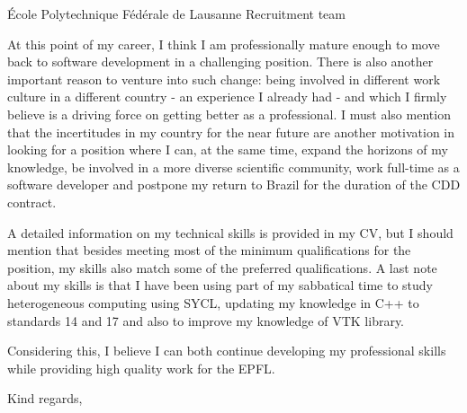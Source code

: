 \documentclass[11pt]{letter}
\begin{document}
\begin{letter}{École Polytechnique Fédérale de Lausanne Recruitment team}
  

  
  At this point of my career, I think I am professionally mature enough to move back to software development in a challenging position. There is also another important reason to venture into such change: being involved in different
  work culture in a different country - an experience I already had - and which I firmly believe is a driving force
  on getting better as a professional. I must also mention that the incertitudes in my country for the near future are another motivation in looking for a position where I can, at the same time, expand the horizons of my knowledge, be involved in a more diverse scientific community, work full-time as a software developer and postpone my return to Brazil for the duration of the CDD contract.

  A detailed information on my technical skills is provided in my CV, but I should mention that besides meeting most of the minimum qualifications for the position, my skills also match some of the preferred qualifications. A last note about my skills is that I have been using part of my sabbatical time to study heterogeneous computing using SYCL, updating my knowledge in C++ to standards 14 and 17 and also to improve my knowledge of VTK library. 

  Considering this, I believe I can both continue developing my professional skills while providing high quality work
  for the EPFL.
  
  \closing{Kind regards,}

  
\end{letter}
\end{document}

